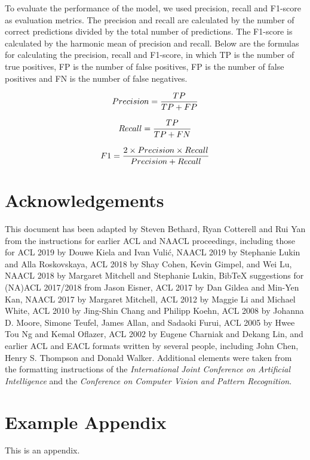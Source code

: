 \documentclass[11pt]{article}
\begin{document}
To evaluate the performance of the model, we used precision, recall and F1-score as evaluation metrics. The precision and recall are calculated by the number of correct predictions divided by the total number of predictions. The F1-score is calculated by the harmonic mean of precision and recall. Below are the formulas for calculating the precision, recall and F1-score, in which TP is the number of true positives, FP is the number of false positives, FP is the number of false positives and FN is the number of false negatives.

\begin{equation}
  Precision={TP\over{TP+FP}}
\end{equation}

\begin{equation}
  Recall={TP\over{TP+FN}}
\end{equation}

\begin{equation}
  F1={2\times{Precision}\times{Recall}\over{Precision+Recall}}
\end{equation}


\section*{Acknowledgements}

This document has been adapted
by Steven Bethard, Ryan Cotterell and Rui Yan
from the instructions for earlier ACL and NAACL proceedings, including those for
ACL 2019 by Douwe Kiela and Ivan Vuli\'{c},
NAACL 2019 by Stephanie Lukin and Alla Roskovskaya,
ACL 2018 by Shay Cohen, Kevin Gimpel, and Wei Lu,
NAACL 2018 by Margaret Mitchell and Stephanie Lukin,
Bib\TeX{} suggestions for (NA)ACL 2017/2018 from Jason Eisner,
ACL 2017 by Dan Gildea and Min-Yen Kan,
NAACL 2017 by Margaret Mitchell,
ACL 2012 by Maggie Li and Michael White,
ACL 2010 by Jing-Shin Chang and Philipp Koehn,
ACL 2008 by Johanna D. Moore, Simone Teufel, James Allan, and Sadaoki Furui,
ACL 2005 by Hwee Tou Ng and Kemal Oflazer,
ACL 2002 by Eugene Charniak and Dekang Lin,
and earlier ACL and EACL formats written by several people, including
John Chen, Henry S. Thompson and Donald Walker.
Additional elements were taken from the formatting instructions of the \emph{International Joint Conference on Artificial Intelligence} and the \emph{Conference on Computer Vision and Pattern Recognition}.




\appendix

\section{Example Appendix}
\label{sec:appendix}

This is an appendix.
\end{document}
